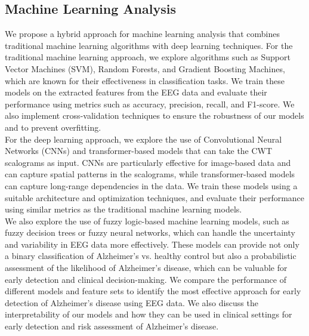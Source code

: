 \documentclass[openany]{book}
\begin{document}
\subsection{Machine Learning Analysis}
We propose a hybrid approach for machine learning analysis that combines traditional machine learning algorithms with deep learning techniques. For the traditional machine learning approach, we explore algorithms such as Support Vector Machines (SVM), Random Forests, and Gradient Boosting Machines, which are known for their effectiveness in classification tasks. We train these models on the extracted features from the EEG data and evaluate their performance using metrics such as accuracy, precision, recall, and F1-score. We also implement cross-validation techniques to ensure the robustness of our models and to prevent overfitting. \\
For the deep learning approach, we explore the use of Convolutional Neural Networks (CNNs) and transformer-based models that can take the CWT scalograms as input. CNNs are particularly effective for image-based data and can capture spatial patterns in the scalograms, while transformer-based models can capture long-range dependencies in the data. We train these models using a suitable architecture and optimization techniques, and evaluate their performance using similar metrics as the traditional machine learning models. \\
We also explore the use of fuzzy logic-based machine learning models, such as fuzzy decision trees or fuzzy neural networks, which can handle the uncertainty and variability in EEG data more effectively. These models can provide not only a binary classification of Alzheimer's vs. healthy control but also a probabilistic assessment of the likelihood of Alzheimer's disease, which can be valuable for early detection and clinical decision-making. We compare the performance of different models and feature sets to identify the most effective approach for early detection of Alzheimer's disease using EEG data. We also discuss the interpretability of our models and how they can be used in clinical settings for early detection and risk assessment of Alzheimer's disease. \\
\end{document}
